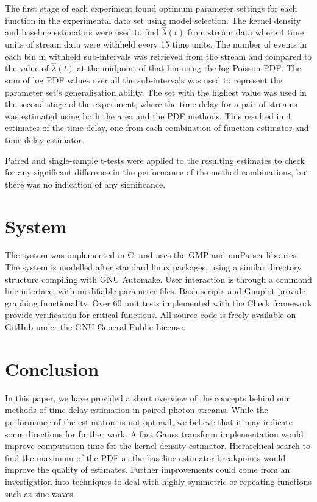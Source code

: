 \documentclass[a4paper,11pt]{article}
\begin{document}
  The first stage of each experiment found optimum parameter settings for each
  function in the experimental data set using model selection. The kernel
  density and baseline estimators were used to find $\hat{\lambda}(t)$ from
  stream data where 4 time units of stream data were withheld every 15 time
  units. The number of events in each bin in withheld sub-intervals was
  retrieved from the stream and compared to the value of $\hat{\lambda}(t)$ at
  the midpoint of that bin using the log Poisson PDF. The sum of log PDF values
  over all the sub-intervals was used to represent the parameter set's
  generalisation ability. The set with the highest value was used in the second
  stage of the experiment, where the time delay for a pair of streams was
  estimated using both the area and the PDF methods. This resulted in 4
  estimates of the time delay, one from each combination of function estimator
  and time delay estimator.

  Paired and single-sample t-tests were applied to the resulting estimates to
  check for any significant difference in the performance of the method
  combinations, but there was no indication of any significance.
\section{System}
\label{sec-6}

  The system was implemented in C, and uses the GMP and muParser libraries. The
  system is modelled after standard linux packages, using a similar directory
  structure compiling with GNU Automake. User interaction is through a command
  line interface, with modifiable parameter files. Bash scripts and Gnuplot
  provide graphing functionality. Over 60 unit tests implemented with the Check
  framework provide verification for critical functions. All source code is
  freely available on GitHub \cite{repo} under the GNU General Public License.
\section{Conclusion}
\label{sec-7}

  In this paper, we have provided a short overview of the concepts behind our
  methods of time delay estimation in paired photon streams. While the
  performance of the estimators is not optimal, we believe that it may indicate
  some directions for further work. A fast Gauss transform implementation would
  improve computation time for the kernel density estimator. Hierarchical search
  to find the maximum of the PDF at the baseline estimator breakpoints would
  improve the quality of estimates. Further improvements could come from an
  investigation into techniques to deal with highly symmetric or repeating
  functions such as sine waves.

\printbibliography
\end{document}
